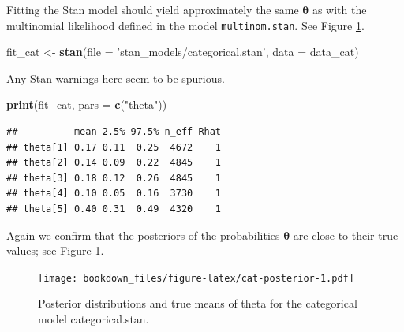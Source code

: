 \documentclass[12pt,]{krantz}
\newenvironment{Shaded}{\begin{snugshade}}{\end{snugshade}}
\newcommand{\DataTypeTok}[1]{\textcolor[rgb]{0.13,0.29,0.53}{#1}}
\newcommand{\DecValTok}[1]{\textcolor[rgb]{0.00,0.00,0.81}{#1}}
\newcommand{\KeywordTok}[1]{\textcolor[rgb]{0.13,0.29,0.53}{\textbf{#1}}}
\newcommand{\NormalTok}[1]{#1}
\newcommand{\OperatorTok}[1]{\textcolor[rgb]{0.81,0.36,0.00}{\textbf{#1}}}
\newcommand{\StringTok}[1]{\textcolor[rgb]{0.31,0.60,0.02}{#1}}
\theoremstyle{definition}
\theoremstyle{definition}
\theoremstyle{definition}
\theoremstyle{remark}
\begin{document}
Fitting the Stan model should yield approximately the same \(\boldsymbol{\theta}\) as with the multinomial likelihood defined in the model \texttt{multinom.stan}. See Figure \ref{fig:cat-posterior}.

\begin{Shaded}
\begin{Highlighting}[]
\NormalTok{fit_cat <-}\StringTok{ }\KeywordTok{stan}\NormalTok{(}\DataTypeTok{file =} \StringTok{'stan_models/categorical.stan'}\NormalTok{, }
                \DataTypeTok{data =}\NormalTok{ data_cat)  }
\end{Highlighting}
\end{Shaded}

Any Stan warnings here seem to be spurious.

\begin{Shaded}
\begin{Highlighting}[]
\KeywordTok{print}\NormalTok{(fit_cat, }\DataTypeTok{pars =} \KeywordTok{c}\NormalTok{(}\StringTok{"theta"}\NormalTok{))}
\end{Highlighting}
\end{Shaded}

\begin{verbatim}
##          mean 2.5% 97.5% n_eff Rhat
## theta[1] 0.17 0.11  0.25  4672    1
## theta[2] 0.14 0.09  0.22  4845    1
## theta[3] 0.18 0.12  0.26  4845    1
## theta[4] 0.10 0.05  0.16  3730    1
## theta[5] 0.40 0.31  0.49  4320    1
\end{verbatim}

Again we confirm that the posteriors of the probabilities \(\boldsymbol{\theta}\) are close to their true values; see Figure \ref{fig:cat-posterior}.

\begin{Shaded}
\end{Shaded}

\begin{figure}
\centering
\texttt{[image: bookdown\_files/figure-latex/cat-posterior-1.pdf]}
\caption{\label{fig:cat-posterior}Posterior distributions and true means of theta for the categorical model categorical.stan.}
\end{figure}
\end{document}
